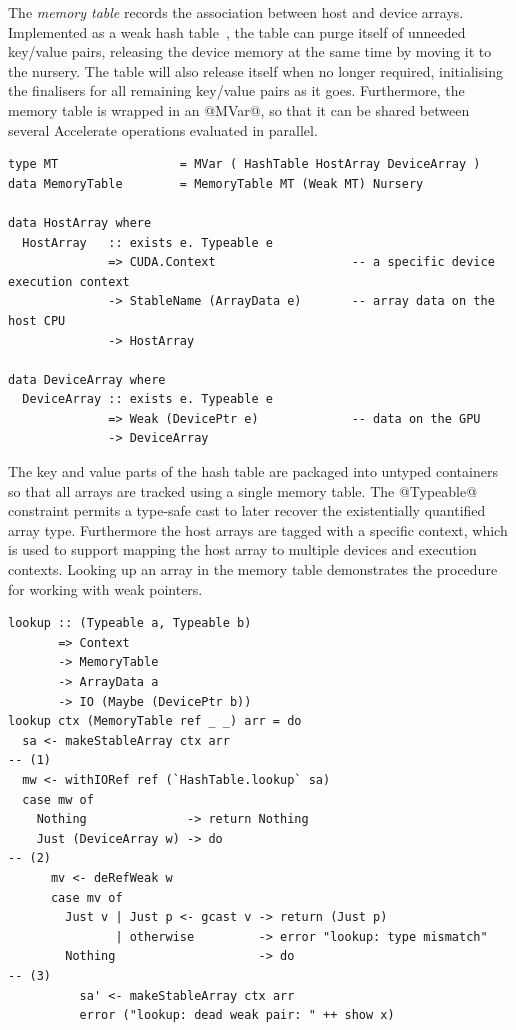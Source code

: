 The \emph{memory table} records the association between host and device arrays.
Implemented as a weak hash table~\cite{PeytonJones:2000ks}, the table can purge
itself of unneeded key/value pairs, releasing the device memory at the same time
by moving it to the nursery. The table will also release itself when no longer
required, initialising the finalisers for all remaining key/value pairs as it
goes. Furthermore, the memory table is wrapped in an @MVar@, so that it can
be shared between several Accelerate operations evaluated in parallel.
%
\begin{lstlisting}[style=haskell]
type MT                 = MVar ( HashTable HostArray DeviceArray )
data MemoryTable        = MemoryTable MT (Weak MT) Nursery

data HostArray where
  HostArray   :: exists e. Typeable e
              => CUDA.Context                   -- a specific device execution context
              -> StableName (ArrayData e)       -- array data on the host CPU
              -> HostArray

data DeviceArray where
  DeviceArray :: exists e. Typeable e
              => Weak (DevicePtr e)             -- data on the GPU
              -> DeviceArray
\end{lstlisting}
%
The key and value parts of the hash table are packaged into untyped containers
so that all arrays are tracked using a single memory table. The @Typeable@
constraint permits a type-safe cast to later recover the existentially
quantified array type. Furthermore the host arrays are tagged with a specific
\CUDA context, which is used to support mapping the host array to multiple
devices and execution contexts. Looking up an array in the memory table
demonstrates the procedure for working with weak pointers.
%
\begin{lstlisting}[style=haskell]
lookup :: (Typeable a, Typeable b)
       => Context
       -> MemoryTable
       -> ArrayData a
       -> IO (Maybe (DevicePtr b))
lookup ctx (MemoryTable ref _ _) arr = do
  sa <- makeStableArray ctx arr                                         -- (1)
  mw <- withIORef ref (`HashTable.lookup` sa)
  case mw of
    Nothing              -> return Nothing
    Just (DeviceArray w) -> do                                          -- (2)
      mv <- deRefWeak w
      case mv of
        Just v | Just p <- gcast v -> return (Just p)
               | otherwise         -> error "lookup: type mismatch"
        Nothing                    -> do                                -- (3)
          sa' <- makeStableArray ctx arr
          error ("lookup: dead weak pair: " ++ show x)
\end{lstlisting}
